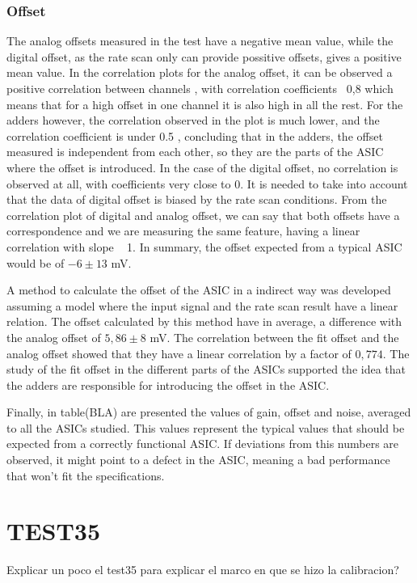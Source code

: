 \documentclass[a4paper,10pt]{book}
\begin{document}
\subsubsection{Offset}
The analog offsets measured in the test have a negative mean value, while the digital offset, as the
rate scan only can provide possitive offsets, gives a positive mean value.
In the correlation plots for the analog offset, it can be observed a positive correlation between
channels , with correlation coefficients ~0,8 which means that for a high offset in one channel it is
also high in all the rest. For the adders however, the correlation observed in the plot is much lower,
and the correlation coefficient is under 0.5 , concluding that in the adders, the offset measured is
independent from each other, so they are the parts of the ASIC where the offset is introduced.
In the case of the digital offset, no correlation is observed at all, with coefficients very close to 0. It
is needed to take into account that the data of digital offset is biased by the rate scan conditions.
From the correlation plot of digital and analog offset, we can say that both offsets have a
correspondence and we are measuring the same feature, having a linear correlation with slope ~ 1.
In summary, the offset expected from a typical ASIC would be of $-6 \pm 13$ mV.

A method to calculate the offset of the ASIC in a indirect way was developed assuming a model
where the input signal and the rate scan result have a linear relation.
The offset calculated by this method have in average, a difference with the analog offset of $5,86 \pm 8$
mV.
The correlation between the fit offset and the analog offset showed that they have a linear
correlation by a factor of $0,774$.
The study of the fit offset in the different parts of the ASICs supported the idea that the adders are
responsible for introducing the offset in the ASIC.


Finally, in table(BLA) are presented the values of gain, offset and noise, averaged to all the ASICs studied. This values represent the typical values that should be expected from a 
correctly functional ASIC. If deviations from this numbers are observed, it might point to a defect in the ASIC, meaning a bad performance that won't fit the specifications. 


\section{TEST35} 
Explicar un poco el test35 para explicar el marco en que se hizo la calibracion?
\end{document}
